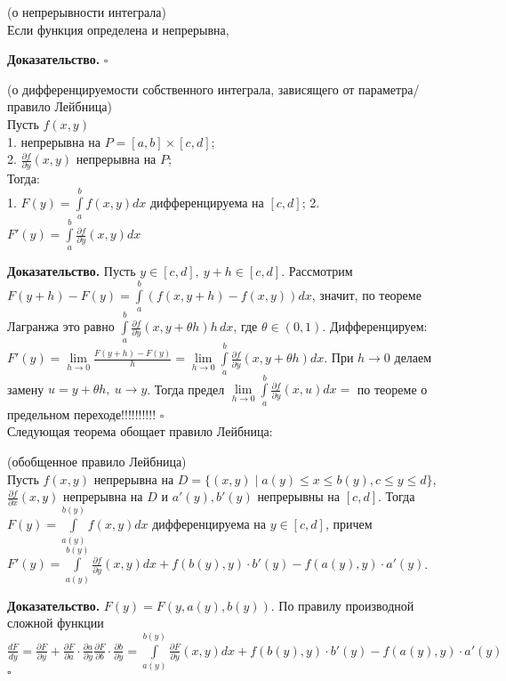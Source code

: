 \begin{theor}
    (о непрерывности интеграла)\\
    Если функция определена и непрерывна, 
\end{theor}
\textbf{Доказательство.}  
$\square$ \\

\begin{theor}
    (о дифференцируемости собственного интеграла, зависящего от параметра/
    правило Лейбница)\\
    Пусть $f(x,y)$ \\
    1. непрерывна на  $P=[a,b]\times[c,d]$;\\
    2. $\frac{\partial f}{\partial y}(x,y)$ непрерывна на $P$;\\
    Тогда:\\
    1. $F(y)=\int\limits_{a}^{b} f(x,y)dx$ дифференцируема на $[c,d]$;
    2. $F'(y)=\int\limits_{a}^{b}\frac{\partial f}{\partial y}(x,y)dx$
\end{theor}
\textbf{Доказательство.} Пусть $y\in[c,d],~y+h\in[c,d]$. 
Рассмотрим  $F(y+h)-F(y)=\int\limits_{a}^{b} (f(x,y+h)-f(x,y))dx$, 
значит, по теореме Лагранжа это равно $\int\limits_{a}^{b}
\frac{\partial f}{\partial y}(x,y+\theta h)h\,dx$, где $\theta\in(0,1)$. 
Дифференцируем:
$F'(y)=\lim\limits_{h \to 0}\frac{F(y+h)-F(y)}{h}=\lim\limits_{h \to 0}
\int\limits_{a}^{b} \frac{\partial f}{\partial y}(x,y+\theta h)dx$.
При $h\to 0$ делаем замену  $u=y+\theta h,~u\to y$. Тогда предел
 $\lim\limits_{h \to 0}
\int\limits_{a}^{b} \frac{\partial f}{\partial y}(x,u)dx=$
по теореме о предельном переходе!!!!!!!!!!
$\square$ \\
Следующая теорема обощает правило Лейбница:
\begin{theor} (обобщенное правило Лейбница)\\
    Пусть $f(x,y)$ непрерывна на  $D=\{(x,y)\mid a(y)\leqslant x\leqslant 
    b(y),c\leqslant y\leqslant d\}$, $\frac{\partial f}{\partial x}(x,y)$ 
    непрерывна на $D$ и $a'(y),b'(y)$ непрерывны на  $[c,d]$. Тогда
     $F(y)=\int\limits_{a(y)}^{b(y)}f(x,y)dx$ дифференцируема на 
     $y\in[c,d]$, причем  $F'(y)=\int\limits_{a(y)}^{b(y)} 
     \frac{\partial f}{\partial y} (x,y)dx+f(b(y),y)\cdot b'(y)-
     f(a(y),y)\cdot a'(y)$.
\end{theor}
\textbf{Доказательство.}  $F(y)=F(y,a(y),b(y))$. По правилу производной
сложной функции  $\frac{dF}{dy}=\frac{\partial F}{\partial y}+
\frac{\partial F}{\partial a}\cdot \frac{\partial a}{\partial y} 
\frac{\partial F}{\partial b}\cdot \frac{\partial b}{\partial y}=
\int\limits_{a(y)}^{b(y)}\frac{\partial F}{\partial y}(x,y)dx
+f(b(y),y)\cdot b'(y)-f(a(y),y)\cdot a'(y)$ $\square$

